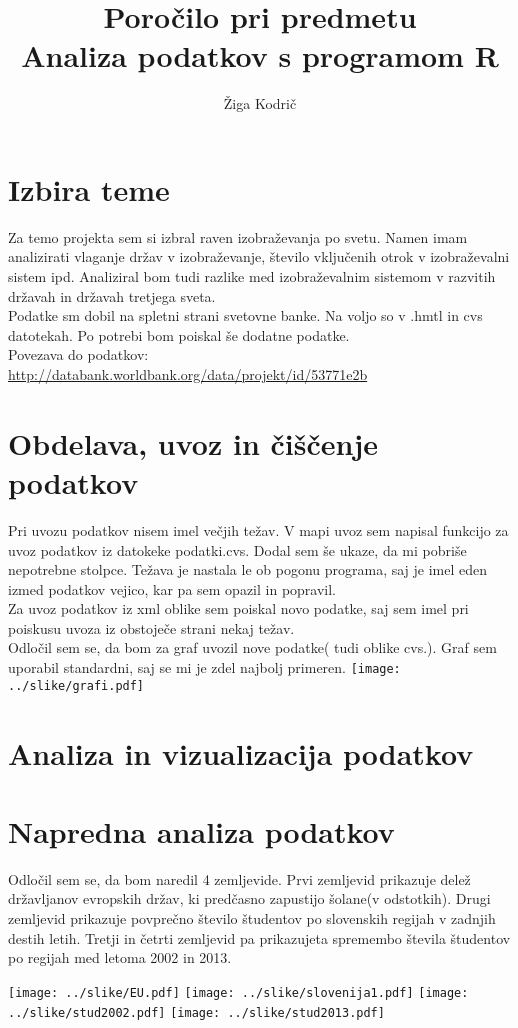 \documentclass[11pt,a4paper]{article}
\begin{document}
\title{Poročilo pri predmetu \\
Analiza podatkov s programom R}
\author{Žiga Kodrič}
\maketitle

\section{Izbira teme}
Za temo projekta sem si izbral raven izobraževanja po svetu. Namen imam analizirati vlaganje držav v izobraževanje, število vključenih otrok v izobraževalni sistem ipd. Analiziral bom tudi razlike med izobraževalnim sistemom v razvitih državah in državah tretjega sveta.
\\
Podatke sm dobil na spletni strani svetovne banke. Na voljo so v .hmtl in cvs datotekah. Po potrebi bom poiskal še dodatne podatke.
\\
Povezava do podatkov: \url{http://databank.worldbank.org/data/projekt/id/53771e2b}
\section{Obdelava, uvoz in čiščenje podatkov}
Pri uvozu podatkov nisem imel večjih težav. V mapi uvoz sem napisal funkcijo za uvoz podatkov iz datokeke podatki.cvs. Dodal sem še ukaze, da mi pobriše nepotrebne stolpce. Težava je nastala le ob pogonu programa, saj je imel eden izmed podatkov vejico, kar pa sem opazil in popravil. \\
Za uvoz podatkov iz xml oblike sem poiskal novo podatke, saj sem imel pri poiskusu uvoza iz obstoječe strani nekaj težav. \\
Odločil sem se, da bom za graf uvozil nove podatke( tudi oblike cvs.). Graf sem uporabil standardni, saj se mi je zdel najbolj primeren.
\texttt{[image: ../slike/grafi.pdf]}
\section{Analiza in vizualizacija podatkov}


\section{Napredna analiza podatkov}
Odločil sem se, da bom naredil 4 zemljevide. Prvi zemljevid prikazuje delež državljanov evropskih držav, ki predčasno zapustijo šolane(v odstotkih). Drugi zemljevid prikazuje povprečno število študentov po slovenskih regijah v zadnjih destih letih. Tretji in četrti zemljevid pa prikazujeta spremembo števila študentov po regijah med letoma 2002 in 2013.

\texttt{[image: ../slike/EU.pdf]}
\texttt{[image: ../slike/slovenija1.pdf]}
\texttt{[image: ../slike/stud2002.pdf]}
\texttt{[image: ../slike/stud2013.pdf]}
\end{document}
